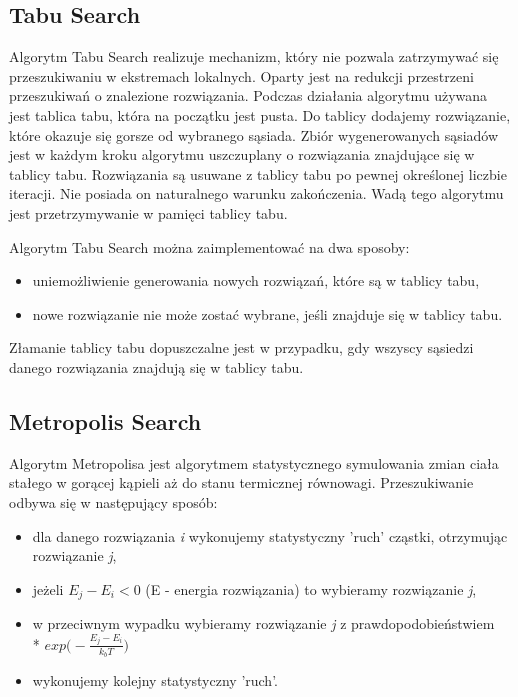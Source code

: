 \subsection{Tabu Search}
Algorytm Tabu Search \cite{tabusearch} realizuje mechanizm, który nie pozwala zatrzymywać się przeszukiwaniu w ekstremach lokalnych. Oparty jest na redukcji przestrzeni przeszukiwań o znalezione rozwiązania. Podczas działania algorytmu używana jest tablica tabu, która na początku jest pusta. Do tablicy dodajemy rozwiązanie, które okazuje się gorsze od wybranego sąsiada. Zbiór wygenerowanych sąsiadów jest w każdym kroku algorytmu uszczuplany o rozwiązania znajdujące się w tablicy tabu. Rozwiązania są usuwane z tablicy tabu po pewnej określonej liczbie iteracji. Nie posiada on naturalnego warunku zakończenia. Wadą tego algorytmu jest przetrzymywanie w pamięci tablicy tabu.

Algorytm Tabu Search można zaimplementować na dwa sposoby:
\begin{itemize}
    \item uniemożliwienie generowania nowych rozwiązań, które są w tablicy tabu,
    \item nowe rozwiązanie nie może zostać wybrane, jeśli znajduje się w tablicy tabu.
\end{itemize}

Złamanie tablicy tabu dopuszczalne jest w przypadku, gdy wszyscy sąsiedzi danego rozwiązania znajdują się w tablicy tabu.

\subsection{Metropolis Search}
Algorytm Metropolisa \cite{metropolis} jest algorytmem statystycznego symulowania zmian ciała stałego w gorącej kąpieli aż do stanu termicznej równowagi. Przeszukiwanie odbywa się w następujący sposób:
\begin{itemize}
    \item dla danego rozwiązania \textit{i} wykonujemy statystyczny 'ruch' cząstki, otrzymując rozwiązanie \textit{j},
    \item jeżeli $E_{j}-E_{i} < 0$ (E - energia rozwiązania) to wybieramy rozwiązanie \textit{j},
    \item w przeciwnym wypadku wybieramy rozwiązanie \textit{j} z prawdopodobieństwiem \\* $exp\Big(-\frac{E_{j}-E_{i}}{k_{b}T}\Big)$
    \item wykonujemy kolejny statystyczny 'ruch'.
\end{itemize}

